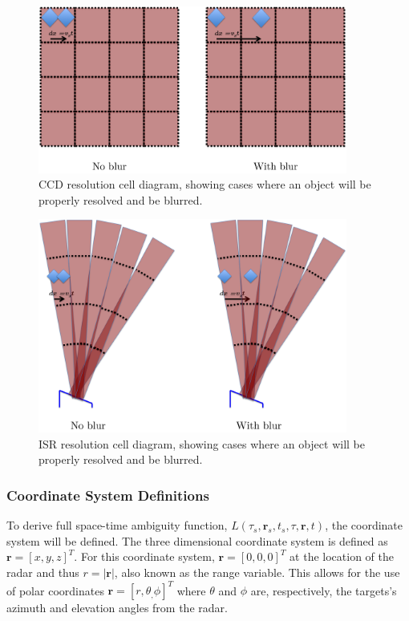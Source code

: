 \begin{figure}[h!]
\centering
	\includegraphics[width=4in]{ccddiagramall}
	\caption{CCD resolution cell diagram, showing cases where an object will be properly resolved and be blurred.}
	\label{fig:ccd}
\end{figure}

\begin{figure}[h!]
\centering
	\includegraphics[width=4in]{radardiagramall}
	\caption{ISR resolution cell diagram, showing cases where an object will be properly resolved and be blurred.}
	\label{fig:radarblur}
\end{figure}

\subsubsection{Coordinate System Definitions}

To derive full space-time ambiguity function, $L(\tau_s,\mathbf{r}_s,t_s,\tau,\mathbf{r},t)$, the coordinate system will be defined.  The three dimensional coordinate system is defined as $\mathbf{r}=[x,y,z]^T$. For this coordinate system, $\mathbf{r}=[0,0,0]^T$ at the location of the radar and thus $r=|\mathbf{r}|$, also known as the range variable. This allows for the use of polar coordinates $\mathbf{r} =  [r,\theta_,\phi]^T$ where $\theta$ and $\phi$ are, respectively, the targets's azimuth and elevation angles from the radar.


